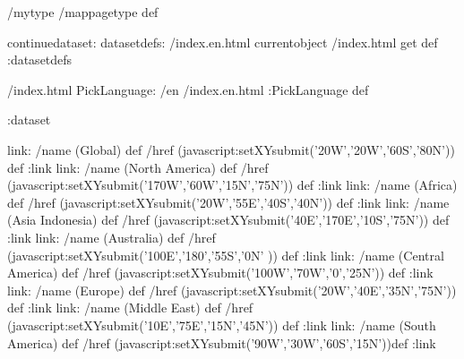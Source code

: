 \begin{ingrid}
/mytype /mappagetype def

continuedataset:
datasetdefs:
/index.en.html currentobject /index.html get def
:datasetdefs

/index.html {
PickLanguage:
/en /index.en.html
:PickLanguage
} def

:dataset

link:
/name (Global) def
/href (javascript:setXYsubmit('20W','20W','60S','80N')) def
:link
link:
/name (North America) def
/href (javascript:setXYsubmit('170W','60W','15N','75N')) def
:link
link:
/name (Africa) def
/href (javascript:setXYsubmit('20W','55E','40S','40N')) def
:link
link:
/name (Asia Indonesia) def
/href (javascript:setXYsubmit('40E','170E','10S','75N')) def
:link
link:
/name (Australia) def
/href (javascript:setXYsubmit('100E','180','55S','0N' )) def
:link
link:
/name (Central America) def
/href (javascript:setXYsubmit('100W','70W','0','25N')) def
:link
link:
/name (Europe) def
/href (javascript:setXYsubmit('20W','40E','35N','75N')) def
:link
link:
/name (Middle East) def
/href (javascript:setXYsubmit('10E','75E','15N','45N')) def
:link
link:
/name (South America) def
/href (javascript:setXYsubmit('90W','30W','60S','15N'))def
:link
\end{ingrid}

